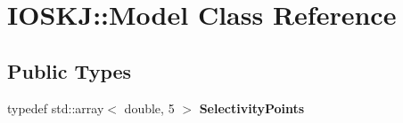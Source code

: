 \hypertarget{classIOSKJ_1_1Model}{\section{I\-O\-S\-K\-J\-:\-:Model Class Reference}
\label{classIOSKJ_1_1Model}
}
\subsection*{Public Types}
\begin{DoxyCompactItemize}
\item 
\hypertarget{classIOSKJ_1_1Model_a925d88350f3dc87464d3893bd9307b91}{typedef std\-::array$<$ double, 5 $>$ {\bfseries Selectivity\-Points}}\label{classIOSKJ_1_1Model_a925d88350f3dc87464d3893bd9307b91}

\end{DoxyCompactItemize}
